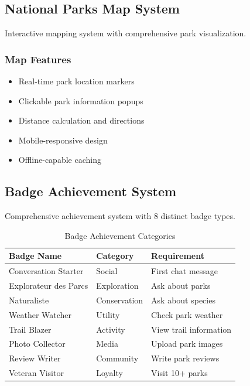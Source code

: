 \documentclass[11pt,a4paper]{article}
\begin{document}
\subsection{National Parks Map System}

Interactive mapping system with comprehensive park visualization.

\subsubsection{Map Features}
\begin{itemize}
    \item Real-time park location markers
    \item Clickable park information popups
    \item Distance calculation and directions
    \item Mobile-responsive design
    \item Offline-capable caching
\end{itemize}

\subsection{Badge Achievement System}

Comprehensive achievement system with 8 distinct badge types.

\begin{table}[H]
    \centering
    \caption{Badge Achievement Categories}
    \label{tab:badges}
    \begin{tabular}{@{}lll@{}}
        \toprule
        Badge Name & Category & Requirement \\
        \midrule
        Conversation Starter & Social & First chat message \\
        Explorateur des Parcs & Exploration & Ask about parks \\
        Naturaliste & Conservation & Ask about species \\
        Weather Watcher & Utility & Check park weather \\
        Trail Blazer & Activity & View trail information \\
        Photo Collector & Media & Upload park images \\
        Review Writer & Community & Write park reviews \\
        Veteran Visitor & Loyalty & Visit 10+ parks \\
        \bottomrule
    \end{tabular}
\end{table}
\end{document}

